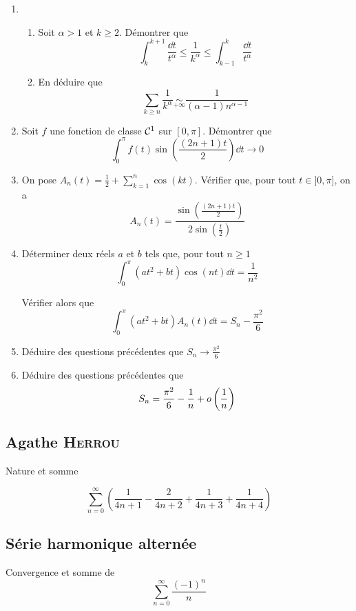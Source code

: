 \begin{enumerate}
    \item   \begin{enumerate}
                \item Soit $\alpha >1$ et $k\geqslant 2$.  Démontrer que
                \[
                    \int_k^{k+1}\frac{\dd t}{t^\alpha} \leqslant \frac{1}{k^\alpha} \leqslant \int_{k-1}^k \frac{\dd t}{t^\alpha}
                \]
                \item En déduire que 
                \[
                    \sum_{k\geqslant n} \frac{1}{k^\alpha} \underset{+\infty}{\sim} \frac{1}{(\alpha -1)n^{\alpha-1}}
                \]
            \end{enumerate}
    \item Soit $f$ une fonction de classe $\mathcal{C}^1$ sur $[0,\pi]$. Démontrer que
    \[
        \int_0^\pi f(t)\sin\left(\frac{(2n+1)t}{2}\right)\dd t \to 0
    \]
    \item On pose $A_n(t) = \frac{1}{2}+\sum_{k=1}^n \cos(kt)$. Vérifier que, pour tout $t\in]0,\pi]$, on a
    \[
        A_n(t)=\frac{\sin \left( \frac{(2n+1)t}{2}\right)}{2\sin\left(\frac{t}{2}\right)}
    \]
    \item Déterminer deux réels $a$ et $b$ tels que, pour tout $n \geqslant 1$
    \[
        \int_0^\pi (at^2+bt)\cos(nt)\dd t=\frac{1}{n^2}
    \]
    
    Vérifier alors que 
    \[
        \int_0^\pi (at^2+bt)A_n(t) \dd t = S_n-\frac{\pi^2}{6}
    \]
    \item Déduire des questions précédentes que $S_n \to \frac{\pi^2}{6}$
    \item Déduire des questions précédentes que 
    \[
        S_n=\frac{\pi^2}{6}-\frac{1}{n}+o\left(\frac{1}{n}\right)
    \]
\end{enumerate}

\subsection{Agathe \textsc{Herrou}}

Nature et somme

\[
    \sum_{n=0}^{\infty} \left(\frac{1}{4n+1} - \frac{2}{4n+2} + \frac{1}{4n+3} + \frac{1}{4n+4}\right)
\]

\subsection{Série harmonique alternée}

Convergence et somme de 
\[
    \sum\limits_{n=0}^\infty \frac{(-1)^n}{n}
\]

